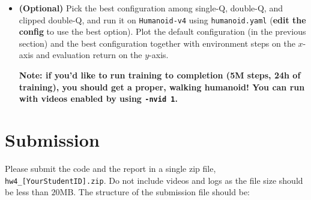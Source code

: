 \documentclass{article}
\begin{document}
\begin{itemize}
    \begin{itemize}
        \item \textbf{Double-Q} achieves the best and most stable performance: final return $\approx 529$, stays high after converging. Its Q-values ($\approx 222$ peak) are slightly higher than Single-Q, suggesting mild overestimation is still present but manageable.
        \item \textbf{Single-Q} reaches a similar peak ($\approx 541$) but is less stable, dropping to $\approx 336$ by the end. Its Q-values are moderate ($\approx 207$). Without any correction, Q-values can be overestimated and the policy may degrade as a result.
        \item \textbf{Clipped Double-Q} is the most conservative: lower peak return ($\approx 386$) and the lowest Q-values ($\approx 161$). Taking the \emph{minimum} of two critics aggressively suppresses overestimation, but this can cause \emph{under}-estimation, which reduces the policy's target signal and slows learning.
        \item \textbf{Relation to overestimation bias}: Single-Q suffers from overestimation (critic is too optimistic), leading to unstable training. Double-Q reduces this by cross-targeting the two critics. Clipped Double-Q corrects most aggressively but at the cost of underestimation. In this short 100K-step run, Double-Q strikes the best balance.
    \end{itemize}

    \item \textbf{(Optional)} Pick the best configuration among single-Q, double-Q, and clipped double-Q, and run it on \verb|Humanoid-v4| using \verb|humanoid.yaml| (\textbf{edit the config} to use the best option). Plot the default configuration (in the previous section) and the best configuration together with environment steps on the $x$-axis and evaluation return on the $y$-axis.
    
    \textbf{Note: if you'd like to run training to completion (5M steps, 24h of training), you should get a proper, walking humanoid! You can run with videos enabled by using \texttt{-nvid 1}.}
\end{itemize}



\section{Submission}

Please submit the code and the report in a single zip file, \texttt{hw4\_[YourStudentID].zip}. Do not include videos and logs as the file size should be less than $20$MB. The structure of the submission file should be:
\end{document}

